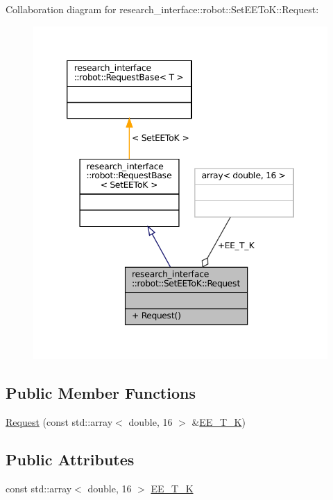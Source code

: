 Collaboration diagram for research\+\_\+interface\+:\+:robot\+:\+:Set\+E\+E\+ToK\+:\+:Request\+:
\nopagebreak
\begin{figure}[H]
\begin{center}
\leavevmode
\includegraphics[width=346pt]{structresearch__interface_1_1robot_1_1SetEEToK_1_1Request__coll__graph}
\end{center}
\end{figure}
\subsection*{Public Member Functions}
\begin{DoxyCompactItemize}
\item 
\hyperlink{structresearch__interface_1_1robot_1_1SetEEToK_1_1Request_a664278c46071abb53e6d1add51fbcbe6}{Request} (const std\+::array$<$ double, 16 $>$ \&\hyperlink{structresearch__interface_1_1robot_1_1SetEEToK_1_1Request_a6844d124905dbbe68ac26e0035f34819}{E\+E\+\_\+\+T\+\_\+K})
\end{DoxyCompactItemize}
\subsection*{Public Attributes}
\begin{DoxyCompactItemize}
\item 
const std\+::array$<$ double, 16 $>$ \hyperlink{structresearch__interface_1_1robot_1_1SetEEToK_1_1Request_a6844d124905dbbe68ac26e0035f34819}{E\+E\+\_\+\+T\+\_\+K}
\end{DoxyCompactItemize}


